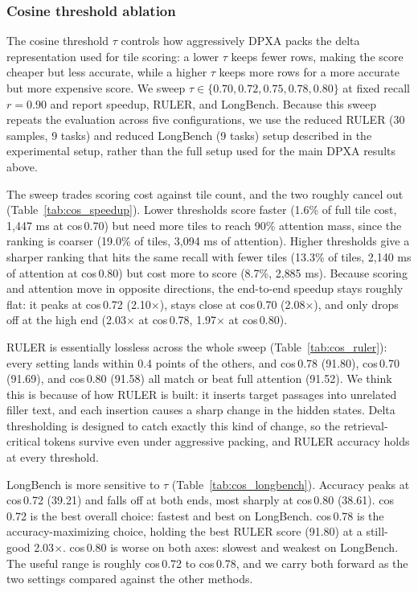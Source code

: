 \subsubsection{Cosine threshold ablation}
\label{sec:results_cos_ablation}

The cosine threshold $\tau$ controls how aggressively DPXA packs the delta representation used for tile scoring: a lower $\tau$ keeps fewer rows, making the score cheaper but less accurate, while a higher $\tau$ keeps more rows for a more accurate but more expensive score. We sweep $\tau \in \{0.70, 0.72, 0.75, 0.78, 0.80\}$ at fixed recall $r{=}0.90$ and report speedup, RULER, and LongBench. Because this sweep repeats the evaluation across five configurations, we use the reduced RULER (30 samples, 9 tasks) and reduced LongBench (9 tasks) setup described in the experimental setup, rather than the full setup used for the main DPXA results above.

The sweep trades scoring cost against tile count, and the two roughly cancel out (Table~\ref{tab:cos_speedup}). Lower thresholds score faster (1.6\% of full tile cost, 1{,}447 ms at cos\,0.70) but need more tiles to reach 90\% attention mass, since the ranking is coarser (19.0\% of tiles, 3{,}094 ms of attention). Higher thresholds give a sharper ranking that hits the same recall with fewer tiles (13.3\% of tiles, 2{,}140 ms of attention at cos\,0.80) but cost more to score (8.7\%, 2{,}885 ms). Because scoring and attention move in opposite directions, the end-to-end speedup stays roughly flat: it peaks at cos\,0.72 (2.10$\times$), stays close at cos\,0.70 (2.08$\times$), and only drops off at the high end (2.03$\times$ at cos\,0.78, 1.97$\times$ at cos\,0.80).

RULER is essentially lossless across the whole sweep (Table~\ref{tab:cos_ruler}): every setting lands within 0.4 points of the others, and cos\,0.78 (91.80), cos\,0.70 (91.69), and cos\,0.80 (91.58) all match or beat full attention (91.52). We think this is because of how RULER is built: it inserts target passages into unrelated filler text, and each insertion causes a sharp change in the hidden states. Delta thresholding is designed to catch exactly this kind of change, so the retrieval-critical tokens survive even under aggressive packing, and RULER accuracy holds at every threshold.

LongBench is more sensitive to $\tau$ (Table~\ref{tab:cos_longbench}). Accuracy peaks at cos\,0.72 (39.21) and falls off at both ends, most sharply at cos\,0.80 (38.61). cos\,0.72 is the best overall choice: fastest and best on LongBench. cos\,0.78 is the accuracy-maximizing choice, holding the best RULER score (91.80) at a still-good 2.03$\times$. cos\,0.80 is worse on both axes: slowest and weakest on LongBench. The useful range is roughly cos\,0.72 to cos\,0.78, and we carry both forward as the two settings compared against the other methods.

